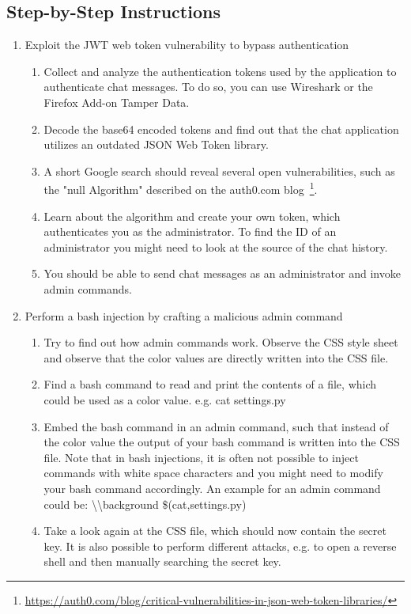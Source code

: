 \documentclass[12pt,a4paper]{article}
\begin{document}
\subsection{Step-by-Step Instructions}
\begin{enumerate}
	\item Exploit the JWT web token vulnerability to bypass authentication
	\begin{enumerate}
		\item Collect and analyze the authentication tokens used by the application to authenticate chat messages. To do so, you can use Wireshark or the Firefox Add-on Tamper Data.
		\item Decode the base64 encoded tokens and find out that the chat application utilizes an outdated JSON Web Token library.
		\item A short Google search should reveal several open vulnerabilities, such as the "null Algorithm" described on the auth0.com blog~\footnote{\url{https://auth0.com/blog/critical-vulnerabilities-in-json-web-token-libraries/}}.
		\item Learn about the algorithm and create your own token, which authenticates you as the administrator. To find the ID of an administrator you might need to look at the source of the chat history.
		\item You should be able to send chat messages as an administrator and invoke admin commands.
	\end{enumerate}
	\item Perform a bash injection by crafting a malicious admin command
	\begin{enumerate}
		\item Try to find out how admin commands work. Observe the CSS style sheet and observe that the color values are directly written into the CSS file.
		\item Find a bash command to read and print the contents of a file, which could be used as a color value. e.g. cat settings.py
		\item Embed the bash command in an admin command, such that instead of the color value the output of your bash command is written into the CSS file. Note that in bash injections, it is often not possible to inject commands with white space characters and you might need to modify your bash command accordingly. An example for an admin command could be: \textbackslash\textbackslash background \$({cat,settings.py})
		\item Take a look again at the CSS file, which should now contain the secret key. It is also possible to perform different attacks, e.g. to open a reverse shell and then manually searching the secret key.
	\end{enumerate}
	
\end{enumerate}
\end{document}
